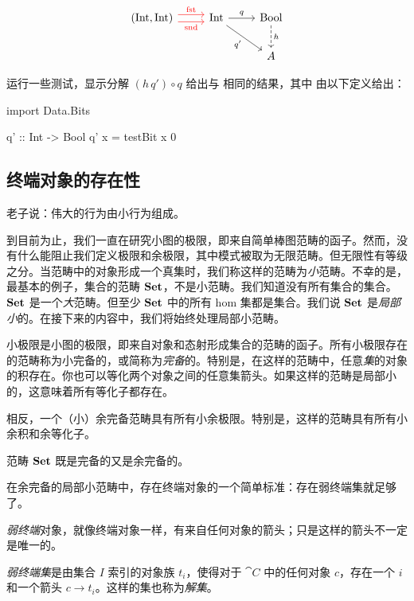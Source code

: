 \documentclass[DaoFP]{subfiles}
\begin{document}
\[
\begin{tikzcd}
(\text{Int}, \text{Int})
\arrow[r, red, shift left=.75ex, "\text{fst}"]
\arrow[r, red, shift right=.75ex, "\text{snd}"']
&
\text{Int}
\arrow[r, "q"]
\arrow[rd, "q'"']
& \text{Bool}
\arrow[d, dashed, "h"]
\\
&& A
\end{tikzcd}
\]

\begin{exercise}
运行一些测试，显示分解 $(h\, q') \circ q$ 给出与  相同的结果，其中  由以下定义给出：
\begin{haskell}
import Data.Bits

q' :: Int -> Bool
q' x = testBit x 0
\end{haskell}

\end{exercise}

\subsection{终端对象的存在性}

老子说：伟大的行为由小行为组成。

到目前为止，我们一直在研究小图的极限，即来自简单棒图范畴的函子。然而，没有什么能阻止我们定义极限和余极限，其中模式被取为无限范畴。但无限性有等级之分。当范畴中的对象形成一个真集时，我们称这样的范畴为\emph{小}范畴。不幸的是，最基本的例子，集合的范畴 $\mathbf{Set}$，不是小范畴。我们知道没有所有集合的集合。$\mathbf{Set}$ 是一个\emph{大}范畴。但至少 $\mathbf{Set}$ 中的所有 hom 集都是集合。我们说 $\mathbf{Set}$ 是\emph{局部小}的。在接下来的内容中，我们将始终处理局部小范畴。

小极限是小图的极限，即来自对象和态射形成集合的范畴的函子。所有小极限存在的范畴称为小完备的，或简称为\emph{完备}的。特别是，在这样的范畴中，任意\emph{集}的对象的积存在。你也可以等化两个对象之间的任意集箭头。如果这样的范畴是局部小的，这意味着所有等化子都存在。

相反，一个（小）余完备范畴具有所有小余极限。特别是，这样的范畴具有所有小余积和余等化子。

范畴 $\mathbf{Set}$ 既是完备的又是余完备的。

在余完备的局部小范畴中，存在终端对象的一个简单标准：存在弱终端集就足够了。

\emph{弱终端}对象，就像终端对象一样，有来自任何对象的箭头；只是这样的箭头不一定是唯一的。

\emph{弱终端集}是由集合 $I$ 索引的对象族 $t_i$，使得对于 $\cat C$ 中的任何对象 $c$，存在一个 $i$ 和一个箭头 $c \to t_i$。这样的集也称为\emph{解集}。
\end{document}
